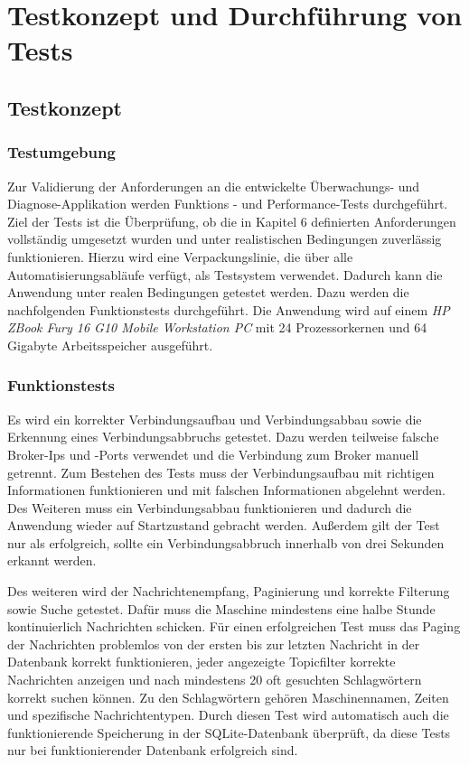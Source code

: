\chapter{Testkonzept und Durchführung von Tests}
\label{cha:Testkonzept und Tests}

\section{Testkonzept}
\subsection{Testumgebung}
Zur Validierung der Anforderungen an die entwickelte Überwachungs- und Diagnose-Applikation werden Funktions - und Performance-Tests durchgeführt. Ziel der Tests ist die Überprüfung, ob die in Kapitel 6 definierten Anforderungen vollständig umgesetzt wurden und unter realistischen Bedingungen zuverlässig funktionieren. Hierzu wird eine Verpackungslinie, die über alle Automatisierungsabläufe verfügt, als Testsystem verwendet. Dadurch kann die Anwendung unter realen Bedingungen getestet werden. Dazu werden die nachfolgenden Funktionstests durchgeführt. Die Anwendung wird auf einem \textit{HP ZBook Fury 16 G10 Mobile Workstation PC} mit 24 Prozessorkernen und 64 Gigabyte Arbeitsspeicher ausgeführt. 
\subsection{Funktionstests}
 Es wird ein korrekter Verbindungsaufbau und Verbindungsabbau sowie die Erkennung eines Verbindungsabbruchs getestet. Dazu werden teilweise falsche Broker-Ips und -Ports verwendet und die Verbindung zum Broker manuell getrennt. Zum  Bestehen des Tests muss der Verbindungsaufbau mit richtigen Informationen funktionieren und mit falschen Informationen abgelehnt werden. Des Weiteren muss ein Verbindungsabbau funktionieren und dadurch die Anwendung wieder auf Startzustand gebracht werden. Außerdem gilt der Test nur als erfolgreich, sollte ein Verbindungsabbruch innerhalb von drei Sekunden erkannt werden. 
 
 Des weiteren wird der Nachrichtenempfang, Paginierung und korrekte Filterung sowie Suche getestet. Dafür muss die Maschine mindestens eine halbe Stunde kontinuierlich Nachrichten schicken. Für einen erfolgreichen Test muss das Paging der Nachrichten problemlos von der ersten bis zur letzten Nachricht in der Datenbank korrekt funktionieren, jeder angezeigte Topicfilter korrekte Nachrichten anzeigen und nach mindestens 20 oft gesuchten Schlagwörtern korrekt suchen können. Zu den Schlagwörtern gehören Maschinennamen, Zeiten und spezifische Nachrichtentypen. Durch diesen Test wird automatisch auch die funktionierende Speicherung in der SQLite-Datenbank überprüft, da diese Tests nur bei funktionierender Datenbank erfolgreich sind.
 
